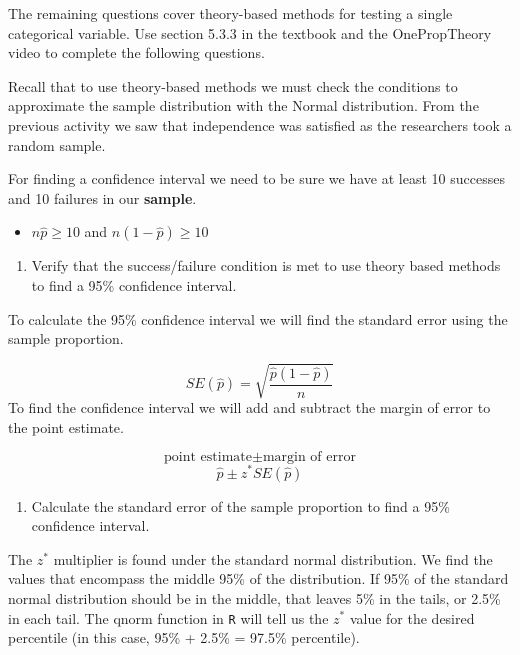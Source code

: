 \documentclass[
]{report}
\providecommand{\tightlist}{%
  \setlength{\itemsep}{0pt}\setlength{\parskip}{0pt}}
\begin{document}
The remaining questions cover theory-based methods for testing a single categorical variable. Use section 5.3.3 in the textbook and the OnePropTheory video to complete the following questions.

Recall that to use theory-based methods we must check the conditions to approximate the sample distribution with the Normal distribution. From the previous activity we saw that independence was satisfied as the researchers took a random sample.

For finding a confidence interval we need to be sure we have at least 10 successes and 10 failures in our \textbf{sample}.

\begin{itemize}
\tightlist
\item
  \(n\hat{p}≥10\) and \(n(1-\hat{p})≥10\)
\end{itemize}

\begin{enumerate}
\def\labelenumi{\arabic{enumi}.}
\tightlist
\item
  Verify that the success/failure condition is met to use theory based methods to find a 95\% confidence interval.
\end{enumerate}

\vspace{0.5in}

To calculate the 95\% confidence interval we will find the standard error using the sample proportion.

\[SE(\hat{p}) = \sqrt{\frac{\hat{p}(1-\hat{p})}{n}}\]
To find the confidence interval we will add and subtract the margin of error to the point estimate.

\[\text{point estimate}\pm\text{margin of error}\]
\[\hat{p}\pm z^* SE(\hat{p})\]

\begin{enumerate}
\def\labelenumi{\arabic{enumi}.}
\setcounter{enumi}{1}
\tightlist
\item
  Calculate the standard error of the sample proportion to find a 95\% confidence interval.
\end{enumerate}

\vspace{0.5in}

The \(z^*\) multiplier is found under the standard normal distribution. We find the values that encompass the middle 95\% of the distribution. If 95\% of the standard normal distribution should be in the middle, that leaves 5\% in the tails, or 2.5\% in each tail. The qnorm function in \texttt{R} will tell us the \(z^*\) value for the desired percentile (in this case, 95\% + 2.5\% = 97.5\% percentile).
\end{document}
